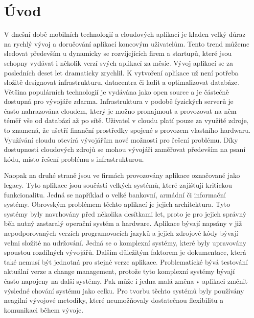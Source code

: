 \chapter{Úvod}
\setcounter{page}{1}
V dnešní době mobilních technologií a cloudových aplikací je kladen velký důraz na rychlý vývoj a doručování aplikací koncovým uživatelům. Tento trend můžeme sledovat především u dynamicky se rozvíjejících firem a startupů, které jsou schopny vydávat i několik verzí svých aplikací za měsíc. Vývoj aplikací se za posledních deset let dramaticky zrychlil. K vytvoření aplikace už není potřeba složitě designovat infrastrukturu, datacentra či ladit a optimalizovat databáze. Většina populárních technologií je vydávána jako open source a je částečně dostupná pro vývojáře zdarma. Infrastruktura v podobě fyzických serverů je často nahrazována cloudem, který je možno pronajmout a provozovat na něm téměř vše od databází až po sítě. Uživatel v cloudu platí pouze za využité zdroje, to znamená, že ušetří finanční prostředky spojené s provozem vlastního hardwaru. Využívání cloudu otevírá vývojářům nové možnosti pro řešení problému. Díky dostupnosti cloudových zdrojů se mohou vývojáři zaměřovat především na psaní kódu, místo řešení problému s infrastrukturou.

Naopak na druhé straně jsou ve firmách provozovány aplikace označované jako legacy. Tyto aplikace jsou součástí velkých systémů, které zajišťují kritickou funkcionalitu. Jedná se například o velké bankovní, armádní či informační systémy. Obrovským problémem těchto aplikací je jejich architektura. Tyto systémy byly navrhovány před několika desítkami let, proto je pro jejich správný běh nutný zastaralý operační systém a hardware. Aplikace bývají napsány v již nepodporovaných verzích programovacích jazyků a jejich zdrojové kódy bývají velmi složité na udržování. Jedná se o komplexní systémy, které byly upravovány spoustou rozdílných vývojářů. Dalším důležitým faktorem je dokumentace, která také nemusí být jednotná pro stejné verze aplikace. Problematické bývá testování aktuální verze a change management, protože tyto komplexní systémy bývají často napojeny na další systémy. Pak může i jedna malá změna v aplikaci změnit výsledné chování systému jako celku. Pro tvorbu těchto systémů byly používány neagilní vývojové metodiky, které neumožňovaly dostatečnou flexibilitu a komunikaci během vývoje.

